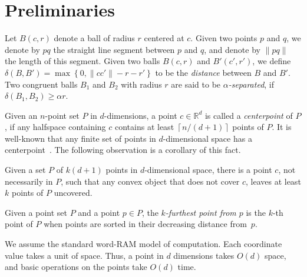 \documentclass[envcountsame]{cls/cccg15}
\renewcommand{\O}{\ensuremath{{O}}}
\newcommand{\IR}{\ensuremath{\mathbb{R}}}
\newcommand{\set}[1]{\left\{ #1 \right\}}
\newcommand{\ceil}[1]{\left\lceil{#1}\right\rceil}
\newcommand{\floor}[1]{\left\lfloor{#1}\right\rfloor}
\newcommand{\len}[1]{\|{#1}\|}
\newcommand{\gee}{\geqslant}
\renewcommand{\geq}{\gee}
\newcommand{\eps}{\varepsilon}
\newcommand{\REM}[1]{}
\begin{document}
\REM{
The rest of this paper is organized as follows.
In Section~\ref{sec:1-center}, we give a simple $2$-approximation algorithm for 
the 1-center problem with outliers that uses $\O(z^2 + zd)$ space.
In the next section, we show a $(1.8 + \eps)$-approximation streaming algorithm for 2-center with $z$ outliers in high dimensions. 
}



\section{Preliminaries}
\label{sec:pre}
Let $B(c,r)$ denote a ball of radius $r$ centered at $c$. 
Given two points $p$ and $q$, we denote by $pq$ the straight line segment between $p$ and $q$,
and denote by $\len{pq}$ the length of this segment. 
Given two balls $B(c,r)$ and $B'(c',r')$, 
we define 
$\delta(B, B') = \max \set{0, \len{cc'}-r-r'}$
to be the \emph{distance} between $B$ and $B'$.
Two congruent balls $B_1$ and $B_2$ with radius $r$ are said to be \emph{$\alpha$-separated}, 
if $\delta(B_1, B_2) \geq \alpha r$.


Given an $n$-point set $P$ in $d$-dimensions,
a point $c \in \IR^d$ is called a \emph{centerpoint} of $P$,
if any halfspace containing $c$ contains at least $\ceil{{n}/({d + 1})}$ points of $P$. 
It is well-known that any finite set of points in $d$-dimensional space 
has a centerpoint~\cite{danzer1963helly}. 
The following observation is a corollary of this fact.

\begin{obs}
\label{obs:omitting-centerpoint}
	Given a set $P$ of $k(d+1)$ points in $d$-dimensional space, 
	there is a point $c$, not necessarily in $P$, 
	such that any convex object that does not cover $c$, 
	leaves at least $k$ points of $P$ uncovered.
\end{obs}

Given a point set $P$ and a point $p \in P$,
the \emph{$k$-furthest point from $p$}
is the $k$-th point of $P$ when points are sorted
in their decreasing distance from~$p$.

We assume the standard word-RAM model of computation. 
Each coordinate value takes a unit of space.
Thus, a point in $d$ dimensions takes $\O(d)$ space,
and basic operations on the points take $\O(d)$ time.
\end{document}
